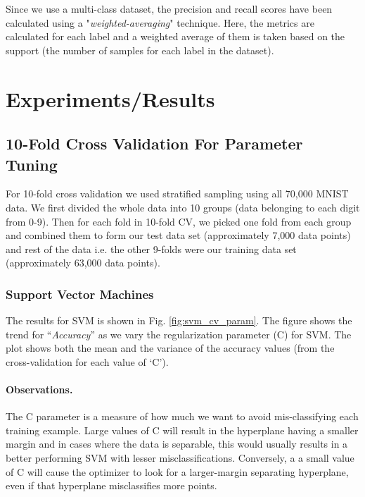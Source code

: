 \documentclass[10pt]{scrartcl}
\begin{document}
Since we use a multi-class dataset, the precision and recall scores have been calculated using a "\textit{weighted-averaging}" technique. Here, the metrics are calculated for each label and a weighted average of them is taken based on the support (the number of samples for each label in the dataset).


\section*{Experiments/Results} 

\subsection*{10-Fold Cross Validation For Parameter Tuning}

For 10-fold cross validation we used stratified sampling using all 70,000 MNIST data. We first divided the whole data into 10 groups (data belonging to each digit from 0-9). Then  for each fold in 10-fold CV, we picked one fold from each group and combined them to form our test data set (approximately 7,000 data points) and rest of the data i.e. the other 9-folds were our training data set (approximately 63,000 data points). 

\subsubsection*{Support Vector Machines}
The results for SVM is shown in Fig. \ref{fig:svm_cv_param}. The figure shows the trend for ``\textit{Accuracy}'' as we vary the regularization parameter (C) for SVM. The plot shows both the mean and the variance of the accuracy values (from the cross-validation for each value of `C'). 

\paragraph{Observations.}
The C parameter is a measure of how much we want to avoid mis-classifying each training example. Large values of C will result in the hyperplane having a smaller margin and in cases where the data is separable, this would usually results in a better performing SVM with lesser misclassifications. Conversely, a a small value of C will cause the optimizer to look for a larger-margin separating hyperplane, even if that hyperplane misclassifies more points. 
\end{document}

